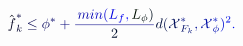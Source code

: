 \documentclass[12pt]{article}
\begin{document}
\makeatletter
\renewcommand*{\@textcolor}[3]{%
  \protect\leavevmode
  \begingroup
    \color#1{#2}#3%
  \endgroup
}
\makeatother
\begin{displaymath}
{\mathcolor[RGB]{0,0,15}{\hat { \mathcolor[RGB]{0,0,30}{f} } }} _ { \mathcolor[RGB]{0,0,45}{k} } ^ { \mathcolor[RGB]{0,0,60}{*} } \mathcolor[RGB]{0,0,75}{\leq} \mathcolor[RGB]{0,0,90}{\phi} ^ { \mathcolor[RGB]{0,0,105}{*} } \mathcolor[RGB]{0,0,120}{+} \mathcolor[RGB]{0,0,135}{\frac { \mathcolor[RGB]{0,0,150}{\operatorname*} { \mathcolor[RGB]{0,0,165}{m} \mathcolor[RGB]{0,0,180}{i} \mathcolor[RGB]{0,0,195}{n} } \mathcolor[RGB]{0,0,210}{(} \mathcolor[RGB]{0,0,225}{L} _ { \mathcolor[RGB]{0,0,240}{f} } \mathcolor[RGB]{0,0,255}{,} \mathcolor[RGB]{0,15,0}{L} _ { \mathcolor[RGB]{0,15,15}{\phi} } \mathcolor[RGB]{0,15,30}{)} } { \mathcolor[RGB]{0,15,45}{2} } } \mathcolor[RGB]{0,15,60}{d} \mathcolor[RGB]{0,15,75}{(} \mathcal { \mathcolor[RGB]{0,15,90}{X} } _ { \mathcolor[RGB]{0,15,105}{F} _ { \mathcolor[RGB]{0,15,120}{k} } } ^ { \mathcolor[RGB]{0,15,135}{*} } \mathcolor[RGB]{0,15,150}{,} \mathcal { \mathcolor[RGB]{0,15,165}{X} } _ { \mathcolor[RGB]{0,15,180}{\phi} } ^ { \mathcolor[RGB]{0,15,195}{*} } \mathcolor[RGB]{0,15,210}{)} ^ { \mathcolor[RGB]{0,15,225}{2} } \mathcolor[RGB]{0,15,240}{.}
\end{displaymath}
\end{document}
